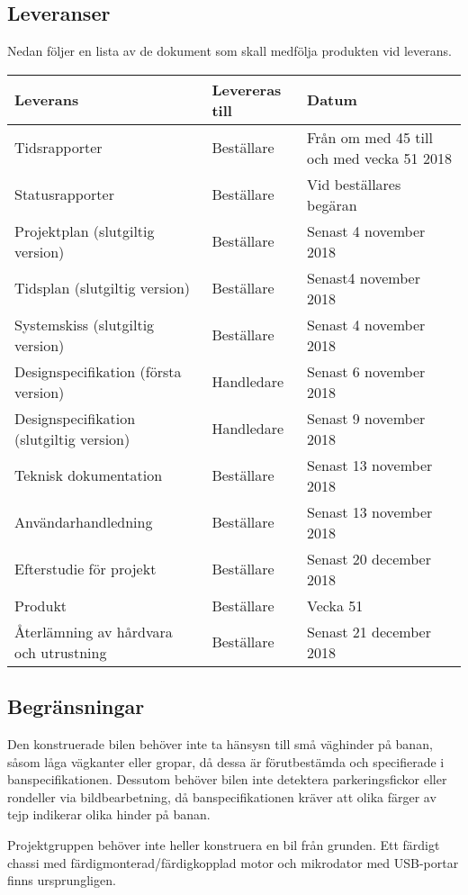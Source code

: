\documentclass[projektplan/plan.tex]{subfiles}
\begin{document}
\noindent
\begin{minipage}{\textwidth}
\subsection{Leveranser}
\label{sec:doc}
Nedan följer en lista av de dokument som skall medfölja produkten vid leverans.
{\renewcommand{\arraystretch}{1.6}
\begin{longtable} {p{7cm}p{3cm}p{5cm}}

    \bfseries Leverans &
    \bfseries Levereras till &
    \bfseries Datum  \\\hline 
    Tidsrapporter &
    Beställare &
    Från om med 45 till och med vecka 51 2018
    \\
    Statusrapporter &
    Beställare &
    Vid beställares begäran
    \\
    Projektplan (slutgiltig version) &
    Beställare &
    Senast 4 november 2018
    \\
    Tidsplan (slutgiltig version) &
    Beställare &
    Senast4 november 2018
    \\
    Systemskiss (slutgiltig version) &
    Beställare &
    Senast 4 november 2018
    \\
    Designspecifikation (första version) &
    Handledare &
    Senast 6 november 2018
    \\
    Designspecifikation (slutgiltig version) &
    Handledare &
    Senast 9 november 2018
    \\
    Teknisk dokumentation &
    Beställare &
    Senast 13 november 2018
    \\
    Användarhandledning &
    Beställare &
    Senast 13 november 2018
    \\
    Efterstudie för projekt &
    Beställare &
    Senast 20 december 2018
    \\ 
    Produkt &
    Beställare &
    Vecka 51
    \\   
    Återlämning av hårdvara och utrustning &
    Beställare &
    Senast 21 december 2018
    \\

    \endhead
\end{longtable}}
\end{minipage}

\subsection{Begränsningar}
Den konstruerade bilen behöver inte ta hänsysn till små väghinder på banan,
såsom låga vägkanter eller gropar, då dessa är förutbestämda och specifierade i
banspecifikationen. Dessutom behöver bilen inte detektera parkeringsfickor
eller rondeller via bildbearbetning, då banspecifikationen kräver att olika
färger av tejp indikerar olika hinder på banan.

Projektgruppen behöver inte heller konstruera en bil från grunden. Ett färdigt
chassi med färdigmonterad/färdigkopplad motor och mikrodator med
USB-portar finns ursprungligen. 
\end{document}
